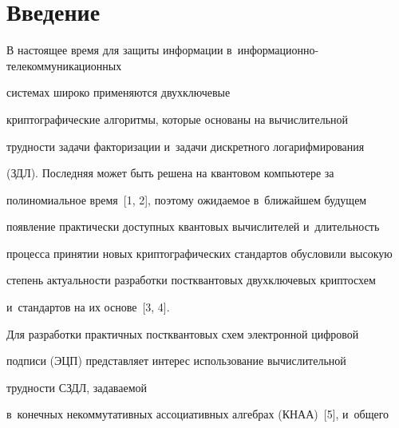 









 \thispagestyle{headings}


 


 \vspace*{-8pt} 


  


\section{Введение}








  В настоящее время для защиты информации в~ин\-фор\-ма\-ци\-он\-но-те\-ле\-ком\-му\-ни\-ка\-ци\-он\-ных 


  сис\-те\-мах широко применяются двухключевые 


криптографические алгоритмы, которые основаны на вычислительной 


трудности задачи факторизации и~задачи дискретного логарифмирования 


(ЗДЛ). Последняя может быть решена на квантовом компьютере за 


полиномиальное время~[1, 2], поэтому ожи\-да\-емое в~ближайшем будущем 


появление практически до\-ступ\-ных квантовых вы\-чис\-ли\-те\-лей и~дли\-тель\-ность 


процесса принятии новых криптографических стандартов обусло\-ви\-ли высокую 


степень ак\-ту\-аль\-ности разработки пост\-кван\-то\-вых двухключевых крип\-то\-схем 


и~стандартов на их основе~[3, 4].


  


  Для разработки практичных постквантовых схем электронной циф\-ро\-вой 


подписи (ЭЦП) представляет интерес использование вычислительной 


труд\-ности СЗДЛ, за\-да\-ва\-емой 


в~конечных некоммутативных ассоциативных ал\-геб\-рах (КНАА)~[5], и~общего 


